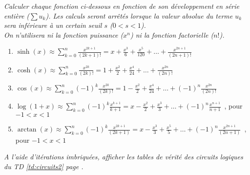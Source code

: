 \begin{td}\label{td:dev}\em {}
Calculer chaque fonction ci-dessous en fonction de son d\'eveloppement 
en série entière ($\sum u_k$). Les calculs seront arr\^et\'es lorsque la 
valeur absolue du terme $u_k$ sera inf\'erieure \`a un certain seuil $s$ 
($0 < s < 1$).\\
On n'utilisera ni la fonction {\em puissance} ($x^n$) ni la fonction 
{\em facto\-riel\-le} ($n!$).
\begin{enumerate}
\item $\displaystyle\sinh(x) \approx \sum_{k=0}^{n} \frac{x^{2k+1}}{(2k+1)!} = 
	x + \frac{x^3}{6} + \frac{x^5}{120} + \ldots + \frac{x^{2n+1}}{(2n+1)!}$
\item $\displaystyle\cosh(x) \approx \sum_{k=0}^{n} \frac{x^{2k}}{(2k)!} = 
	1 + \frac{x^2}{2} + \frac{x^4}{24} + \ldots + \frac{x^{2n}}{(2n)!}$
\item $\displaystyle\cos(x) \approx \sum_{k=0}^{n} (-1)^k\frac{x^{2k}}{(2k)!} = 
	1 - \frac{x^2}{2} + \frac{x^4}{24} + \ldots + (-1)^n\frac{x^{2n}}{(2n)!}$
\item $\displaystyle\log(1+x) \approx \sum_{k=0}^{n} (-1)^k\frac{x^{k+1}}{k+1} = 
	x - \frac{x^2}{2} + \frac{x^3}{3} + \ldots + (-1)^n\frac{x^{n+1}}{n+1}$\ , 
	pour $-1 < x < 1$
\item $\displaystyle\arctan(x) \approx \sum_{k=0}^{n} (-1)^k \frac{x^{2k+1}}{(2k+1)} = 
	x - \frac{x^3}{3} + \frac{x^5}{5} + \ldots + (-1)^n \frac{x^{2n+1}}{(2n+1)}$\ , 
	pour $-1 < x < 1$
\end{enumerate}
\end{td}

\begin{td}\label{td:tablesVerite}\em {}
A l'aide d'itérations imbriquées, afficher les tables de vérité des circuits
	logiques du TD \ref{td:circuits2} page \pageref{td:circuits2}.
\end{td}

